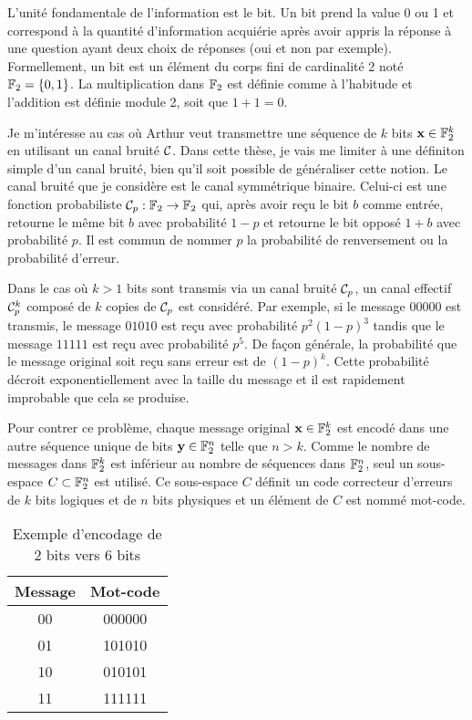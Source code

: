 L'unité fondamentale de l'information est le bit.
Un bit prend la value 0 ou 1 et correspond à la quantité 
d'information acquiérie après avoir appris la réponse 
à une question ayant deux choix de réponses (oui et non par exemple).
Formellement, un bit est un élément du corps fini de cardinalité 2 noté $\mathbb{F}_{2} = \qty{0, 1}$.
La multiplication dans $\mathbb{F}_{2}$ est définie comme à l'habitude
et l'addition est définie module 2, soit que $1 + 1 = 0$.

Je m'intéresse au cas où Arthur veut transmettre une séquence 
de $k$ bits $\vb{x} \in \mathbb{F}_{2}^k$ en utilisant un canal bruité $\mathcal{C}$.
Dans cette thèse,
je vais me limiter à une définiton simple d'un canal bruité,
bien qu'il soit possible de généraliser cette notion. 
Le canal bruité que je considère est le canal symmétrique binaire.
Celui-ci est une fonction probabiliste $\mathcal {\mathcal{C}}_p: \mathbb{F}_{2} \to \mathbb{F}_{2}$
qui, après avoir reçu le bit $b$ comme entrée, 
retourne le même bit $b$ avec probabilité $1 - p$ et retourne le
bit opposé $1 + b$ avec probabilité $p$.
Il est commun de nommer $p$ la probabilité de renversement 
ou la probabilité d'erreur.

Dans le cas où $k > 1$ bits sont transmis via un canal bruité $\mathcal{C}_p$,
un canal effectif $\mathcal{C}_p^k$ composé de $k$ copies de $\mathcal{C}_p$
est considéré.
Par exemple,
si le message $00000$ est transmis,
le message $01010$ est reçu avec probabilité $p^2(1 - p)^3$ 
tandis que le message $11111$ est reçu avec probabilité $p^5$.
De façon générale, 
la probabilité que le message original soit reçu sans erreur est de $(1 - p)^k$.
Cette probabilité décroit exponentiellement avec la taille du message 
et il est rapidement improbable que cela se produise.

Pour contrer ce problème,
chaque message original $\vb x \in \mathbb{F}_{2}^k$ est encodé dans une autre séquence 
unique de bits $\vb{y} \in \mathbb{F}_{2}^n$ telle que $n > k$.
Comme le nombre de messages dans $\mathbb{F}_{2}^k$ est inférieur au nombre
de séquences dans $\mathbb{F}_{2}^n$,
seul un sous-espace $C \subset \mathbb{F}_{2}^n$ est utilisé.
Ce sous-espace $C$ définit un code correcteur d'erreurs
de $k$ bits logiques et de $n$ bits physiques 
et un élément de $C$ est nommé mot-code.

\begin{table}[t]
  \caption{Exemple d'encodage de 2 bits vers 6 bits}
  \label{tab:exemple_encodage}
  \begin{center}
    \begin{tabular}[c]{cc}
      \textbf{Message} & \textbf{Mot-code} \\
      \hline
      00 & 000000 \\
      01 & 101010 \\
      10 & 010101 \\
      11 & 111111
    \end{tabular}
  \end{center}
\end{table}

